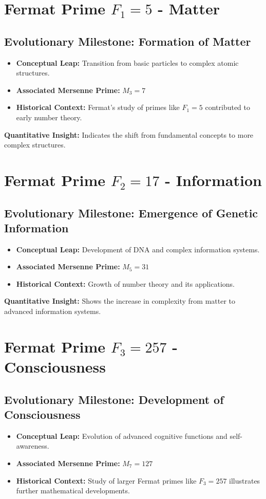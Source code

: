 \documentclass[12pt]{article}
\begin{document}
\section{Fermat Prime \( F_1 = 5 \) - Matter}
\subsection{Evolutionary Milestone: Formation of Matter}
\begin{itemize}
    \item \textbf{Conceptual Leap:} Transition from basic particles to complex atomic structures.
    \item \textbf{Associated Mersenne Prime:} \( M_3 = 7 \)
    \item \textbf{Historical Context:} Fermat's study of primes like \( F_1 = 5 \) contributed to early number theory.
\end{itemize}

\textbf{Quantitative Insight:} Indicates the shift from fundamental concepts to more complex structures.

\section{Fermat Prime \( F_2 = 17 \) - Information}
\subsection{Evolutionary Milestone: Emergence of Genetic Information}
\begin{itemize}
    \item \textbf{Conceptual Leap:} Development of DNA and complex information systems.
    \item \textbf{Associated Mersenne Prime:} \( M_5 = 31 \)
    \item \textbf{Historical Context:} Growth of number theory and its applications.
\end{itemize}

\textbf{Quantitative Insight:} Shows the increase in complexity from matter to advanced information systems.

\section{Fermat Prime \( F_3 = 257 \) - Consciousness}
\subsection{Evolutionary Milestone: Development of Consciousness}
\begin{itemize}
    \item \textbf{Conceptual Leap:} Evolution of advanced cognitive functions and self-awareness.
    \item \textbf{Associated Mersenne Prime:} \( M_7 = 127 \)
    \item \textbf{Historical Context:} Study of larger Fermat primes like \( F_3 = 257 \) illustrates further mathematical developments.
\end{itemize}
\end{document}
